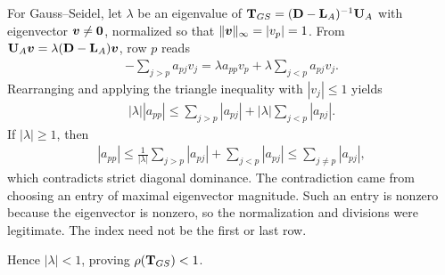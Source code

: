 \documentclass[../main.tex]{subfiles}
\begin{document}
{For Gauss--Seidel, let $\lambda$ be an eigenvalue of $\mathbf{T}_{GS} = (\mathbf{D} - \mathbf{L}_A)^{-1}\mathbf{U}_A$ with eigenvector $\boldsymbol{v} \neq \mathbf{0}$, normalized so that $\|\boldsymbol{v}\|_\infty = |v_p| = 1$. From $\mathbf{U}_A \boldsymbol{v} = \lambda(\mathbf{D} - \mathbf{L}_A)\boldsymbol{v}$, row $p$ reads
\begin{align*}
    -\sum_{j > p} a_{pj} v_j = \lambda a_{pp} v_p + \lambda \sum_{j < p} a_{pj} v_j.
\end{align*}
Rearranging and applying the triangle inequality with $|v_j| \leq 1$ yields
\begin{align*}
    |\lambda| |a_{pp}|
    \leq \sum_{j > p} |a_{pj}| + |\lambda| \sum_{j < p} |a_{pj}|.
\end{align*}
If $|\lambda| \ge 1$, then
\begin{align*}
    |a_{pp}| \leq \frac{1}{|\lambda|} \sum_{j > p} |a_{pj}| + \sum_{j < p} |a_{pj}| \leq \sum_{j \neq p} |a_{pj}|,
\end{align*}
which contradicts strict diagonal dominance. The contradiction came from choosing an entry of maximal eigenvector magnitude. Such an entry is nonzero because the eigenvector is nonzero, so the normalization and divisions were legitimate. The index need not be the first or last row.

Hence $|\lambda| < 1$, proving $\rho(\mathbf{T}_{GS}) < 1$.
}

\label{thm:spd-gs-convergence}
\end{document}
